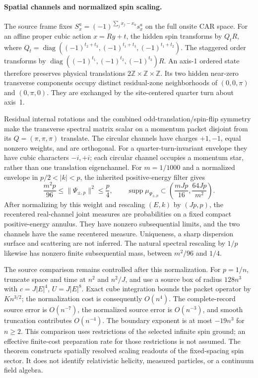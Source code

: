 \paragraph{Spatial channels and normalized spin scaling.}
The source frame fixes
$S_x^a=(-1)^{\sum_j x_j-x_a}s_x^a$ on the full onsite CAR space.
For an affine proper cubic action $x=Ry+t$, the hidden spin transforms
by $Q_tR$, where
$Q_t=\operatorname{diag}((-1)^{t_2+t_3},(-1)^{t_1+t_3},(-1)^{t_1+t_2})$.
The staggered order transforms by
$\operatorname{diag}((-1)^{t_1},(-1)^{t_2},(-1)^{t_3})R$.
An axis-1 ordered state therefore preserves physical translations
$2\mathbb Z\times\mathbb Z\times\mathbb Z$.
Its two hidden near-zero transverse components occupy distinct
residual-zone neighborhoods of $(0,0,\pi)$ and $(0,\pi,0)$.
They are exchanged by the site-centered quarter turn about axis~1.

Residual internal rotations and the combined odd-translation/spin-flip
symmetry make the transverse spectral matrix scalar on a momentum
packet disjoint from its $Q=(\pi,\pi,\pi)$ translate.
The circular channels have charges $+1,-1$, equal nonzero weights,
and are orthogonal. For a quarter-turn-invariant envelope they have
cubic characters $-i,+i$; each circular channel occupies a momentum
star, rather than one translation eigenchannel.
For $m=1/1000$ and a normalized envelope in $p/2<|k|<p$, the inherited
positive-energy filter gives
\[
 \frac{m^2p}{96}\le\|\Psi_{\pm,p}\|^2\le\frac p4,\qquad
 \operatorname{supp}\mu_{\Psi_{\pm,p}}
 \subset\left(\frac{mJp}{16},\frac{64Jp}{m^2}\right).
\]
After normalizing by this weight and rescaling $(E,k)$ by $(Jp,p)$,
the recentered real-channel joint measures are probabilities on
a fixed compact positive-energy annulus. They have nonzero
subsequential limits, and the two channels have the same recentered
measure. Uniqueness, a sharp dispersion surface and scattering are
not inferred.
The natural spectral rescaling by $1/p$ likewise has nonzero finite
subsequential mass, between $m^2/96$ and $1/4$.

The source comparison remains controlled after this normalization.
For $p=1/n$, truncate space and time at $n^2$ and $n^2/J$, and use
a source box of radius $128n^3$ with
$c=J|E|^4$, $U=J|E|^8$.
Exact cube integration bounds the packet operator by $K n^{3/2}$;
the normalization cost is consequently $O(n^4)$.
The complete-record source error is $O(n^{-7})$, the normalized
source error is $O(n^{-3})$, and smooth truncation contributes
$O(n^{-4})$. The boundary exponent is at most $-19n^3$ for $n\ge2$.
This comparison uses restrictions of the selected infinite spin ground;
an effective finite-cost preparation rate for those restrictions is
not assumed. The theorem constructs spatially resolved scaling
readouts of the fixed-spacing spin sector. It does not identify
relativistic helicity, measured particles, or a continuum field algebra.
